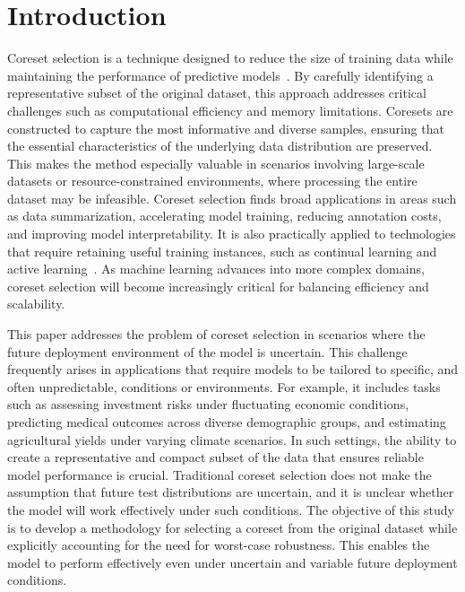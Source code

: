 
\section{Introduction}

Coreset selection is a technique designed to reduce the size of training data while maintaining the performance of predictive models~\citep{guo2022deepcore}.
%
By carefully identifying a representative subset of the original dataset, this approach addresses critical challenges such as computational efficiency and memory limitations.
%
Coresets are constructed to capture the most informative and diverse samples, ensuring that the essential characteristics of the underlying data distribution are preserved.
%
This makes the method especially valuable in scenarios involving large-scale datasets or resource-constrained environments, where processing the entire dataset may be infeasible.
%
Coreset selection finds broad applications in areas such as data summarization, accelerating model training, reducing annotation costs, and improving model interpretability.
%
It is also practically applied to technologies that require retaining useful training instances, such as continual learning and active learning~\citep{sener2017active, toneva2019forgetting, paul2021deep, ducoffe2018adversarial, margatina2021active}.
%
As machine learning advances into more complex domains, coreset selection will become increasingly critical for balancing efficiency and scalability.

This paper addresses the problem of coreset selection in scenarios where the future deployment environment of the model is uncertain.
%
This challenge frequently arises in applications that require models to be tailored to specific, and often unpredictable, conditions or environments.
%
For example, it includes tasks such as assessing investment risks under fluctuating economic conditions, predicting medical outcomes across diverse demographic groups, and estimating agricultural yields under varying climate scenarios.
%
In such settings, the ability to create a representative and compact subset of the data that ensures reliable model performance is crucial.
%
Traditional coreset selection does not make the assumption that future test distributions are uncertain, and it is unclear whether the model will work effectively under such conditions.
%
The objective of this study is to develop a methodology for selecting a coreset from the original dataset while explicitly accounting for the need for worst-case robustness. This enables the model to perform effectively even under uncertain and variable future deployment conditions.

